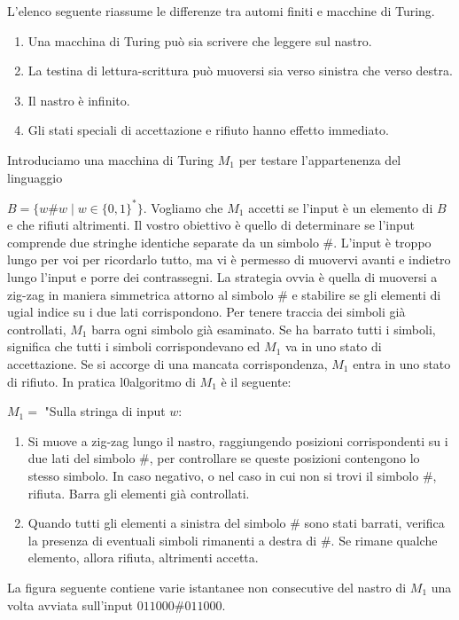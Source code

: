 \documentclass{article}
\begin{document}
L'elenco seguente riassume le differenze tra automi finiti e macchine di Turing.

\begin{enumerate}
    \item Una macchina di Turing può sia scrivere che leggere sul nastro.
    \item La testina di lettura-scrittura può muoversi sia verso sinistra che verso destra.
    \item Il nastro è infinito.
    \item Gli stati speciali di accettazione e rifiuto hanno effetto immediato.
\end{enumerate}

Introduciamo una macchina di Turing $M_1$ per testare l'appartenenza del linguaggio 

$B = \{w\#w\mid w\in \{0,1\}^* \}$.
Vogliamo che $M_1$ accetti se l'input è un elemento di $B$ e che rifiuti altrimenti.
Il vostro obiettivo è quello di determinare se l'input comprende due stringhe identiche separate da un simbolo $\#$.
L'input è troppo lungo per voi per ricordarlo tutto, ma vi è permesso di muovervi avanti e indietro lungo l'input e porre dei contrassegni.
La strategia ovvia è quella di muoversi a zig-zag in maniera simmetrica attorno al simbolo $\#$ e stabilire se gli elementi di ugial indice su i due lati corrispondono.
Per tenere traccia dei simboli già controllati, $M_1$ barra ogni simbolo già esaminato.
Se ha barrato tutti i simboli, significa che tutti i simboli corrispondevano ed $M_1$ va in uno stato di accettazione.
Se si accorge di una mancata corrispondenza, $M_1$ entra in uno stato di rifiuto.
In pratica l0algoritmo di $M_1$ è il seguente:

$M_1 = $ "Sulla stringa di input $w$:
\begin{enumerate}
    \item Si muove a zig-zag lungo il nastro, raggiungendo posizioni corrispondenti su i due lati del simbolo $\#$, per controllare se queste posizioni contengono lo stesso simbolo. In caso negativo, o nel caso in cui non si trovi il simbolo $\#$, rifiuta. Barra gli elementi già controllati.
    \item Quando tutti gli elementi a sinistra del simbolo $\#$ sono stati barrati, verifica la presenza di eventuali simboli rimanenti a destra di $\#$. Se rimane qualche elemento, allora rifiuta, altrimenti accetta.
\end{enumerate}

La figura seguente contiene varie istantanee non consecutive del nastro di $M_1$ una volta avviata sull'input $011000\#011000$.
\end{document}
